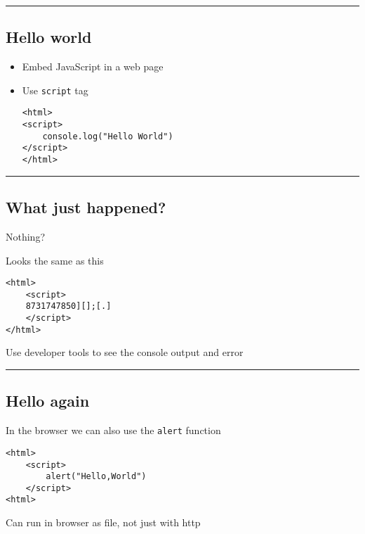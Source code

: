 \documentclass{article}[18pt]
\providecommand{\tightlist}{%
	\setlength{\itemsep}{0pt}\setlength{\parskip}{0pt}}
\begin{document}
\begin{center}\rule{0.5\linewidth}{\linethickness}\end{center}

\hypertarget{hello-world}{%
	\subsection{Hello world}\label{hello-world}}

\begin{itemize}
	\tightlist
	\item
	Embed JavaScript in a web page
	\item
	Use \texttt{script} tag
\begin{verbatim}
<html>
<script>
	console.log("Hello World")
</script>
</html>
\end{verbatim}
\end{itemize}


\begin{center}\rule{0.5\linewidth}{\linethickness}\end{center}

\hypertarget{what-just-happened}{%
	\subsection{What just happened?}\label{what-just-happened}}

Nothing?

Looks the same as this
\begin{verbatim}
<html>
	<script>
	8731747850][];[.]
	</script>
</html>
\end{verbatim}

Use developer tools to see the console output and error

\begin{center}\rule{0.5\linewidth}{\linethickness}\end{center}

\subsection{Hello again}

In the browser we can also use the \texttt{alert} function

\begin{verbatim}
<html>
	<script>
		alert("Hello,World")
	</script>
<html>
\end{verbatim}

Can run in browser as file, not just with http
\end{document}
